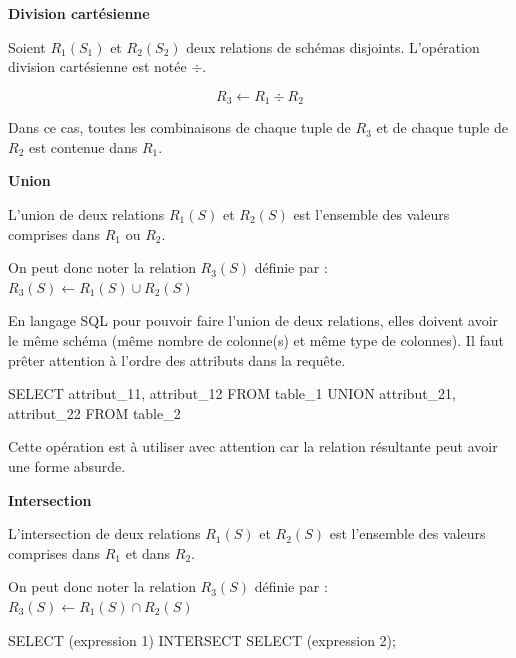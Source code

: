 \documentclass[10pt,fleqn]{article} %
\begin{document}
\begin{defi}

\textbf{Division cartésienne}

Soient $R_1(S_1)$ et $R_2(S_2)$ deux relations de schémas disjoints. L'opération division cartésienne est notée $\div$. 

$$
R_3 \leftarrow R_1 \div R_2
$$

Dans ce cas, toutes les combinaisons de chaque tuple de $R_3$ et de chaque tuple de $R_2$ est contenue dans $R_1$.

\end{defi}


\begin{defi}

\textbf{Union}

L'union de deux relations $R_1(S)$ et $R_2(S)$ est l'ensemble des valeurs comprises dans $R_1$ ou $R_2$. 

On peut donc noter la relation $R_3(S)$ définie par : $R_3(S)\leftarrow R_1(S)\cup R_2(S)$
\end{defi}

\begin{envsql}
En langage SQL pour pouvoir faire l'union de deux relations, elles doivent avoir le même schéma (même nombre de colonne(s) et même type de colonnes). Il faut prêter attention à l'ordre des attributs dans la requête. 

\begin{sql}
SELECT  attribut_11, attribut_12 FROM table_1 UNION attribut_21, attribut_22 FROM table_2
\end{sql}
\end{envsql}


\begin{rem}
Cette opération est à utiliser avec attention car la relation résultante peut avoir une forme absurde.
\end{rem}


\begin{defi}

\textbf{Intersection}

L'intersection de deux relations $R_1(S)$ et $R_2(S)$ est l'ensemble des valeurs comprises dans $R_1$ et dans $R_2$. 

On peut donc noter la relation $R_3(S)$ définie par : $R_3(S)\leftarrow R_1(S)\cap R_2(S)$
\end{defi}

\begin{envsql}
\begin{sql}
SELECT  (expression 1) INTERSECT SELECT (expression 2);
\end{sql}
\end{envsql}
\end{document}

